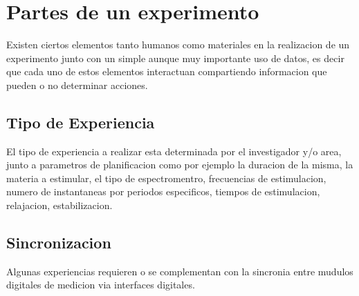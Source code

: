 \section{Partes de un experimento}

Existen ciertos elementos tanto humanos como materiales en la realizacion de un experimento junto con un 
simple aunque muy importante uso de datos, es decir que cada uno de estos elementos interactuan compartiendo
informacion que pueden o no determinar acciones.

\subsection{Tipo de Experiencia}
El tipo de experiencia a realizar esta determinada por el investigador y/o area, junto a parametros de planificacion
como por ejemplo la duracion de la misma, la materia a estimular, el tipo de espectromentro, frecuencias
de estimulacion, numero de instantaneas por periodos especificos, tiempos de estimulacion, relajacion, estabilizacion.

\subsection{Sincronizacion}
Algunas experiencias requieren o se complementan con la sincronia entre mudulos digitales de medicion via interfaces 
digitales.

\newpage